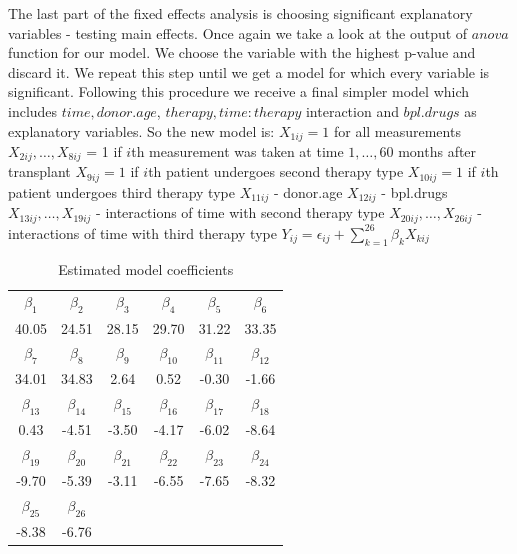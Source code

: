 \documentclass[num-refs]{wiley-article}
\begin{document}
The last part of the fixed effects analysis is choosing significant explanatory variables - testing main effects. Once again we take a look at the output of $anova$ function for our model. We choose the variable with the highest p-value and discard it. We repeat this step until we get a model for which every variable is significant. Following this procedure we receive a final simpler model which includes $time, donor.age$, $ therapy, time:therapy$ interaction and $bpl.drugs$ as explanatory variables. So the new model is: \newline
$X_{1ij} = 1$ for all measurements \newline
$X_{2ij}, \ldots, X_{8ij}$ = 1 if $i$th measurement was taken at time $1, \ldots, 60$ months after transplant  \newline
$X_{9ij} = 1$ if $i$th patient undergoes second therapy type \newline
$X_{10ij} = 1$ if $i$th patient undergoes third therapy type \newline
$X_{11ij}$ - donor.age \newline
$X_{12ij}$ - bpl.drugs \newline
$X_{13ij}, \ldots, X_{19ij}$ - interactions of time with second therapy type \newline
$X_{20ij}, \ldots, X_{26ij}$ - interactions of time with third therapy type \newline \newline
$Y_{ij} = \epsilon_{ij} + \sum_{k=1}^{26} \beta_k X_{kij}$ \newline

\begin{table}[H]
\centering
\begin{threeparttable}
\begin{tabular}{cccccc}
\headrow
$\beta_{1}$ & $\beta_{2}$ & $\beta_{3}$ & $\beta_{4}$ & $\beta_{5}$ & $\beta_{6}$ \\
40.05 & 24.51 & 28.15 & 29.70 & 31.22 & 33.35 \\ 
$\beta_{7}$ & $\beta_{8}$ & $\beta_{9}$ & $\beta_{10}$ & $\beta_{11}$ & $\beta_{12}$ \\
34.01 & 34.83 & 2.64 & 0.52 & -0.30 & -1.66 \\ 
$\beta_{13}$ & $\beta_{14}$ & $\beta_{15}$ & $\beta_{16}$ & $\beta_{17}$ & $\beta_{18}$ \\
0.43 & -4.51 & -3.50 & -4.17 & -6.02 & -8.64 \\
$\beta_{19}$ & $\beta_{20}$ & $\beta_{21}$ & $\beta_{22}$ & $\beta_{23}$ & $\beta_{24}$ \\
-9.70 & -5.39 & -3.11 & -6.55 & -7.65 & -8.32 \\
$\beta_{25}$ & $\beta_{26}$ & & & & \\
-8.38 & -6.76 & & & &  \\ 
\hline  %
\end{tabular}
\end{threeparttable}
\caption{Estimated model coefficients}
\end{table}
\end{document}
